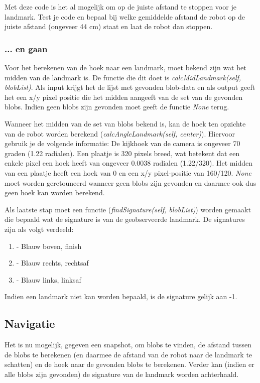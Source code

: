 \documentclass[a4paper]{article}
\begin{document}
Met deze code is het al mogelijk om op de juiste afstand te stoppen voor je landmark. Test je code en bepaal bij welke gemiddelde afstand de robot op de juiste afstand (ongeveer 44 cm) staat en laat de robot dan stoppen.

\subsubsection{... en gaan}
Voor het berekenen van de hoek naar een landmark, moet bekend zijn wat het midden van de landmark is. De functie die dit doet is \textit{calcMidLandmark(self, blobList)}. Als input krijgt het de lijst met gevonden blob-data en als output geeft het een x/y pixel positie die het midden aangeeft van de set van de gevonden blobs. Indien geen blobs zijn gevonden moet geeft de functie \textit{None} terug.

Wanneer het midden van de set van blobs bekend is, kan de hoek ten opzichte van de robot worden berekend (\textit{calcAngleLandmark(self, center)}). Hiervoor gebruik je de volgende informatie:
De kijkhoek van de camera is ongeveer 70 graden (1.22 radialen). Een plaatje is 320 pixels breed, wat betekent dat een enkele pixel een hoek heeft van ongeveer 0.0038 radialen (1.22/320). Het midden van een plaatje heeft een hoek van 0 en een x/y pixel-positie van 160/120. \textit{None} moet worden geretouneerd wanneer geen blobs zijn gevonden en daarmee ook dus geen hoek kan worden berekend.

\newpage

Als laatste stap moet een functie (\textit{findSignature(self, blobList)}) worden gemaakt die bepaald wat de signature is van de geobserveerde landmark. De signatures zijn als volgt verdeeld:

\begin{enumerate}
\item - Blauw boven, finish
\item - Blauw rechts, rechtsaf
\item - Blauw links, linksaf
\end{enumerate}

Indien een landmark niet kan worden bepaald, is de signature gelijk aan -1.

\subsection{Navigatie}

Het is nu mogelijk, gegeven een snapshot, om blobs te vinden, de afstand tussen de blobs te berekenen (en daarmee de afstand van de robot naar de landmark te schatten) en de hoek naar de gevonden blobs te berekenen. Verder kan (indien er alle blobs zijn gevonden) de signature van de landmark worden achterhaald.
\end{document}
